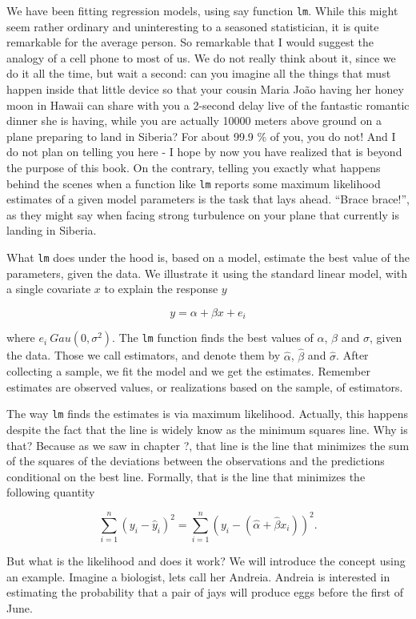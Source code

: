 \documentclass[
]{book}
\begin{document}
We have been fitting regression models, using say function \texttt{lm}. While this might seem rather ordinary and uninteresting to a seasoned statistician, it is quite remarkable for the average person. So remarkable that I would suggest the analogy of a cell phone to most of us. We do not really think about it, since we do it all the time, but wait a second: can you imagine all the things that must happen inside that little device so that your cousin Maria João having her honey moon in Hawaii can share with you a 2-second delay live of the fantastic romantic dinner she is having, while you are actually 10000 meters above ground on a plane preparing to land in Siberia? For about 99.9 \% of you, you do not! And I do not plan on telling you here - I hope by now you have realized that is beyond the purpose of this book. On the contrary, telling you exactly what happens behind the scenes when a function like \texttt{lm} reports some maximum likelihood estimates of a given model parameters is the task that lays ahead. ``Brace brace!'', as they might say when facing strong turbulence on your plane that currently is landing in Siberia.

What \texttt{lm} does under the hood is, based on a model, estimate the best value of the parameters, given the data. We illustrate it using the standard linear model, with a single covariate \(x\) to explain the response \(y\)

\[y=\alpha+\beta x+e_i\]

where \(e_i~Gau(0,\sigma^2)\). The \texttt{lm} function finds the best values of \(\alpha\), \(\beta\) and \(\sigma\), given the data. Those we call estimators, and denote them by \(\hat \alpha\), \(\hat \beta\) and \(\hat \sigma\). After collecting a sample, we fit the model and we get the estimates. Remember estimates are observed values, or realizations based on the sample, of estimators.

The way \texttt{lm} finds the estimates is via maximum likelihood. Actually, this happens despite the fact that the line is widely know as the minimum squares line. Why is that? Because as we saw in chapter ?, that line is the line that minimizes the sum of the squares of the deviations between the observations and the predictions conditional on the best line. Formally, that is the line that minimizes the following quantity

\[\sum_{i=1}^n (y_i-\hat y_i)^2=\sum_{i=1}^n (y_i-(\hat \alpha+ \hat \beta x_i))^2.\]

But what is the likelihood and does it work? We will introduce the concept using an example. Imagine a biologist, lets call her Andreia. Andreia is interested in estimating the probability that a pair of jays will produce eggs before the first of June.
\end{document}
